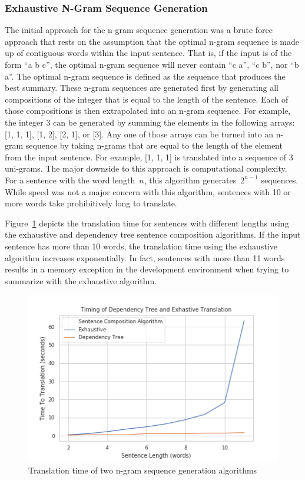 \documentclass{article}[10]
\begin{document}
\subsubsection{Exhaustive N-Gram Sequence Generation\label{sec:exhaustive}}

The initial approach for the n-gram sequence generation was a brute
force approach that rests on the assumption that the optimal n-gram
sequence is made up of contiguous words within the input sentence. That
is, if the input is of the form ``a b c'', the optimal n-gram sequence
will never contain ``c a'', ``c b'', nor ``b a''. The optimal n-gram
sequence is defined as the sequence that produces the best summary.
These n-gram sequences are generated first by generating all
compositions of the integer that is equal to the length of the sentence.
Each of those compositions is then extrapolated into an n-gram sequence.
For example, the integer 3 can be generated by summing the elements in
the following arrays: [1, 1, 1], [1, 2], [2, 1], or [3].
Any one of those arrays can be turned into an n-gram sequence by taking
n-grams that are equal to the length of the element from the input
sentence. For example, [1, 1, 1] is translated into a sequence of 3
uni-grams. The major downside to this approach is computational
complexity. For a sentence with the word length~\(n\), this
algorithm generates~\(2^{n-1}\) sequences. While speed was not a
major concern with this algorithm, sentences with 10 or more words take
prohibitively long to translate.

Figure~\ref{fig:timing} depicts the translation time
for sentences with different lengths using the exhaustive and dependency
tree sentence composition algorithms. If the input sentence has more
than 10 words, the translation time using the exhaustive algorithm
increases exponentially. In fact, sentences with more than 11 words
results in a memory exception in the development environment when
trying to summarize with the exhaustive algorithm.

\begin{figure}[H]
  \begin{center}
    \includegraphics[width=\columnwidth]{figures/timing.png}
    \caption{Translation time of two n-gram sequence generation
      algorithms\label{fig:timing}}
  \end{center}
\end{figure}
\end{document}
